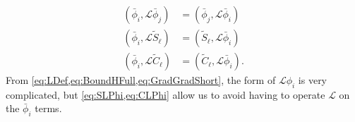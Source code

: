 \documentclass[Dissertation.tex]{subfiles}
\begin{document}
\begin{subequations}
\label{eq:ShortElemSymm}
\begin{align}
\left(\bar{\phi}_i, \mathcal{L} \bar{\phi}_j \right) &= \left(\bar{\phi}_j, \mathcal{L} \bar{\phi}_i \right) \\
\left(\bar{\phi}_i, \mathcal{L} \widetilde{S}_\ell \right) &= \left(\widetilde{S}_\ell, \mathcal{L} \bar{\phi}_i \right) \label{eq:SLPhi} \\
\left(\bar{\phi}_i, \mathcal{L} \widetilde{C}_\ell \right) &= \left(\widetilde{C}_\ell, \mathcal{L} \bar{\phi}_i \right) \label{eq:CLPhi}.
\end{align}
\end{subequations}
From \cref{eq:LDef,eq:BoundHFull,eq:GradGradShort}, the form of $\mathcal{L}\phi_i$ is very complicated, but \cref{eq:SLPhi,eq:CLPhi} allow us to avoid having to operate $\mathcal{L}$ on the $\bar{\phi}_i$ terms.
\end{document}

